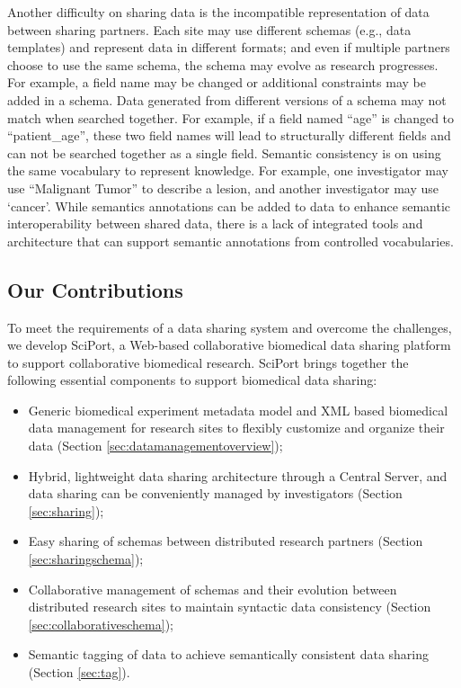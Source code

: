 \documentclass{doublecol-new}
\theoremstyle{TH}{
\newtheorem{lemma}{Lemma}
\newtheorem{theorem}[lemma]{Theorem}
\newtheorem{corrolary}[lemma]{Corrolary}
\newtheorem{conjecture}[lemma]{Conjecture}
\newtheorem{proposition}[lemma]{Proposition}
\newtheorem{claim}[lemma]{Claim}
\newtheorem{stheorem}[lemma]{Wrong Theorem}
\newtheorem{algorithm}{Algorithm}
}
\theoremstyle{THrm}{
\newtheorem{definition}{Definition}[section]
\newtheorem{question}{Question}[section]
\newtheorem{remark}{Remark}
\newtheorem{scheme}{Scheme}
}
\theoremstyle{THhit}{
\newtheorem{case}{Case}[section]
}
\begin{document}
Another difficulty on sharing data is the incompatible
representation of data between sharing partners. Each site may use
different schemas (e.g., data templates) and represent data in
different formats; and even if multiple partners choose to use the
same schema, the schema may evolve as research progresses. For
example, a field name may be changed or additional constraints may
be added in a schema. Data generated from different versions of a
schema  may not match when searched together. For example, if a
field named ``age'' is changed to ``patient\_age'',  these two field
names will lead to structurally different fields and can not be
searched together as a single field.   Semantic consistency is on
using the same vocabulary to represent knowledge. For example,  one
investigator may use ``Malignant Tumor'' to describe a lesion, and
another investigator  may use `cancer'.    While semantics
annotations can be added to data to enhance semantic
interoperability between shared data, there is a lack of integrated
tools and architecture that can support semantic annotations from
controlled vocabularies.

\subsection{Our Contributions}


To meet the requirements of a data sharing system and overcome the
challenges, we develop SciPort, a Web-based collaborative biomedical
data sharing platform to support collaborative biomedical research.
SciPort brings together the following essential components to
support biomedical data sharing:


\begin{itemize}

\item Generic biomedical experiment metadata model and XML based biomedical data management for research sites to flexibly customize and organize their data (Section
\ref{sec:datamanagementoverview});

\item Hybrid, lightweight data sharing architecture through a Central
Server, and data sharing can be conveniently managed by investigators (Section \ref{sec:sharing});

\item Easy sharing of schemas between distributed research partners (Section \ref{sec:sharingschema});

\item Collaborative management of schemas and their evolution between distributed research sites to maintain syntactic data consistency  (Section \ref{sec:collaborativeschema});

\item Semantic tagging of data to achieve semantically consistent data sharing (Section \ref{sec:tag}).
\end{itemize}
\end{document}

